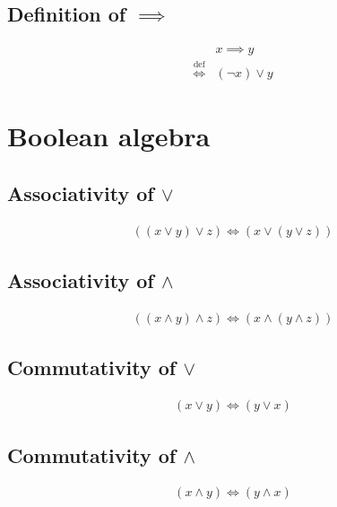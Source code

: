 \subsection{Definition of $\implies$}
\begin{defn}
\label{Definition:implies}
\begin{align*}
& x \implies y \\
\overset{\operatorname{def}}{\iff} & (\lnot x) \lor y
\end{align*}
\end{defn}

\section{Boolean algebra}
\subsection{Associativity of $\lor$}
\begin{prop}
\label{Proposition:lor_associativity}
\begin{align*}
((x \lor y) \lor z) \iff (x \lor (y \lor z))
\end{align*}
\end{prop}

\subsection{Associativity of $\land$}
\begin{prop}
\label{Proposition:land_associativity}
\begin{align*}
((x \land y) \land z) \iff (x \land (y \land z))
\end{align*}
\end{prop}

\subsection{Commutativity of $\lor$}
\begin{prop}
\label{Proposition:lor_commutativity}
\begin{align*}
(x \lor y) \iff (y \lor x)
\end{align*}
\end{prop}

\subsection{Commutativity of $\land$}
\begin{prop}
\label{Proposition:land_commutativity}
\begin{align*}
(x \land y) \iff (y \land x)
\end{align*}
\end{prop}

